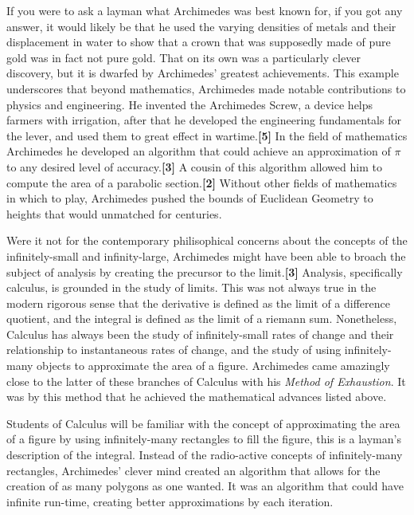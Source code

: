\documentclass[letterpaper, 12pt]{amsart}
\theoremstyle{definition}  %
\begin{document}
	If you were to ask a layman what Archimedes was best known for, if you got any answer, it would likely be that he used the varying densities of metals and their displacement in water to show that a crown that was supposedly made of pure gold was in fact not pure gold.
	That on its own was a particularly clever discovery, but it is dwarfed by Archimedes' greatest achievements.
	This example underscores that beyond mathematics, Archimedes made notable contributions to physics and engineering.
	He invented the Archimedes Screw, a device helps farmers with irrigation, after that he developed the engineering fundamentals for the lever, and used them to great effect in wartime.\textbf{[5]}
	In the field of mathematics Archimedes he developed an algorithm that could achieve an approximation of $\pi$ to any desired level of accuracy.\textbf{[3]}
	A cousin of this algorithm allowed him to compute the area of a parabolic section.\textbf{[2]}
	Without other fields of mathematics in which to play, Archimedes pushed the bounds of Euclidean Geometry to heights that would unmatched for centuries.

	Were it not for the contemporary philisophical concerns about the concepts of the infinitely-small and infinity-large, Archimedes might have been able to broach the subject of analysis by creating the precursor to the limit.\textbf{[3]}
	Analysis, specifically calculus, is grounded in the study of limits.
	This was not always true in the modern rigorous sense that the derivative is defined as the limit of a difference quotient, and the integral is defined as the limit of a riemann sum.
	Nonetheless, Calculus has always been the study of infinitely-small rates of change and their relationship to instantaneous rates of change, and the study of using infinitely-many objects to approximate the area of a figure.
	Archimedes came amazingly close to the latter of these branches of Calculus with his \textit{Method of Exhaustion}.
	It was by this method that he achieved the mathematical advances listed above.

	Students of Calculus will be familiar with the concept of approximating the area of a figure by using infinitely-many rectangles to fill the figure, this is a layman's description of the integral.
	Instead of the radio-active concepts of infinitely-many rectangles, Archimedes' clever mind created an algorithm that allows for the creation of as many polygons as one wanted.
	It was an algorithm that could have infinite run-time, creating better approximations by each iteration.
\end{document}
